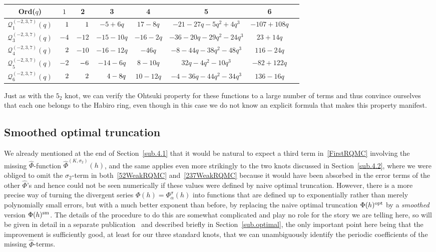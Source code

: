 \documentclass[pdftex]{sigma}
\numberwithin{equation}{section}
\def\Phih{\widehat\Phi}
\def\a{\alpha}
\def\a{\alpha}
\def\s{\sigma}
\def\sQ{\mathcal{Q}}
\begin{document}
\begin{center}
\def\arraystretch{1.2}
\begin{tabular}{c|ccccccc}
 Ord($q$) & $1 $ & 2 & 3 & 4 & 5 & 6\\ \hline
 $\sQ^{(-2,3,7)}_1(q)$ & $\hphantom{-}1 $ & $\hphantom{-1}1 $ & $ -5+6 q $ & $ 17-8 q $ &
 $ -21-27 q-5 q^2+4 q^3 $ & $ -107+108 q $
 \\
 $\sQ^{(-2,3,7)}_3(q)$ & $-4 $ & $ -12 $ & $ -15 - 10q $ & $ -16 - 2q $
 & $ -36 - 20q - 29q^2 - 24q^3 $ & $ 23 + 14q $ \\
 $\sQ^{(-2,3,7)}_4(q)$ & $\hphantom{-}2 $ & $ -10 $ & $ -16 - 12q $ & $ -46q $
 & $ -8 - 44q - 38q^2 - 48q^3 $ & $ 116 - 24q $ \\
 $\sQ^{(-2,3,7)}_5(q)$ & $-2 $ & $ \hphantom{1}{-}6 $ & $ -14 - 6q $ & $ 8 - 10q $
 & $ 32q - 4q^2 - 10q^3 $ & $ -82 + 122q $ \\
 $\sQ^{(-2,3,7)}_6(q)$ & $\hphantom{-}2 $ & $\hphantom{-1}2 $ & $ \hphantom{-1}4 - 8q $ & $ 10 - 12q $
 & $ -4 - 36q - 44q^2 - 34q^3 $ & $ 136 - 16q $
\end{tabular}
\end{center}
Just as with the $5_2$ knot, we can verify the Ohtsuki property for these functions
to a large number of terms and thus convince ourselves that each one belongs to the
Habiro ring, even though in this case we do not know an explicit formula that makes
this property manifest.

\subsection{Smoothed optimal truncation}
\label{sub.4.3}

We already mentioned at the end of Section~\ref{sub.4.1} that it would be natural
to expect a third term in~\eqref{FirstRQMC} involving the missing $\Phih$-function
$\Phih^{(K,\s_2)}(h)$, and the same applies even more strikingly to the two knots
discussed in Section~\ref{sub.4.2}, where we were obliged to omit the $\s_2$-term
in both~\eqref{52WeakRQMC} and~\eqref{237WeakRQMC} because it would have been absorbed
in the error terms of the other $\Phih$'s and hence could not be seen numerically if
these values were defined by naive optimal truncation. However, there is a more
precise way of turning the divergent series $\Phi(h)=\Phi_\a^{\s}(h)$ into functions
that are defined up to exponentially rather than merely polynomially small errors, but
with a much better exponent than before, by replacing the naive optimal truncation
$\Phi(h)^{{\rm opt}}$ by a \emph{smoothed} version $\Phi(h)^{{\rm sm}}$. The details of
the procedure to do this are somewhat complicated and play no role for the story
we are telling here, so will be given in detail in a separate
publication~\cite{GZ:optimal} and described briefly in Section~\ref{sub.optimal},
the only important point here being that the improvement is sufficiently
good, at least for our three standard knots, that we can unambiguously identify
the periodic coefficients of the missing $\Phih$-terms.
\end{document}

